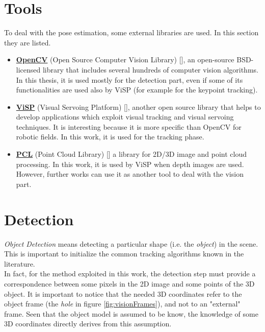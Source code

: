 \section{Tools}
\label{sec:visionTools}
To deal with the pose estimation, some external libraries are used. In this section they are listed.

\begin{itemize}


	\item \href{https://opencv.org/}{\textbf{OpenCV}} (Open Source Computer Vision Library) [\cite{opencv}],  an open-source BSD-licensed library that includes several hundreds of computer vision algorithms. In this thesis, it is used mostly for the detection part, even if some of its functionalities are used also by ViSP (for example for the keypoint tracking).
	
	\item \href{https://visp.inria.fr/}{\textbf{ViSP}} (Visual Servoing Platform) [\cite{visp}], another open source library that helps to develop applications which exploit visual tracking and visual servoing techniques. It is interesting because it is more specific than OpenCV for robotic fields. In this work, it is used for the tracking phase.
	
	\item \href{http://www.pointclouds.org/}{\textbf{PCL}} (Point Cloud Library) [\cite{pclLib}] a library for 2D/3D image and point cloud processing. In this work, it is used by ViSP when depth images are used. However, further works can use it as another tool to deal with the vision part.
	
\end{itemize}

\section{Detection}
\label{sec:visDetect}

\textit{Object Detection} means detecting a particular shape (i.e. the \textit{object}) in the scene. This is important to initialize the common tracking algorithms known in the literature.\\

In fact, for the method exploited in this work, the detection step must provide a correspondence between some pixels in the 2D image and some points of the 3D object. It is important to notice that the needed 3D coordinates refer to the object frame (the \textit{hole} in figure \ref{fig:visionFrames}), and not to an "external" frame. Seen that the object model is assumed to be know, the knowledge of some 3D coordinates directly derives from this assumption.\\

